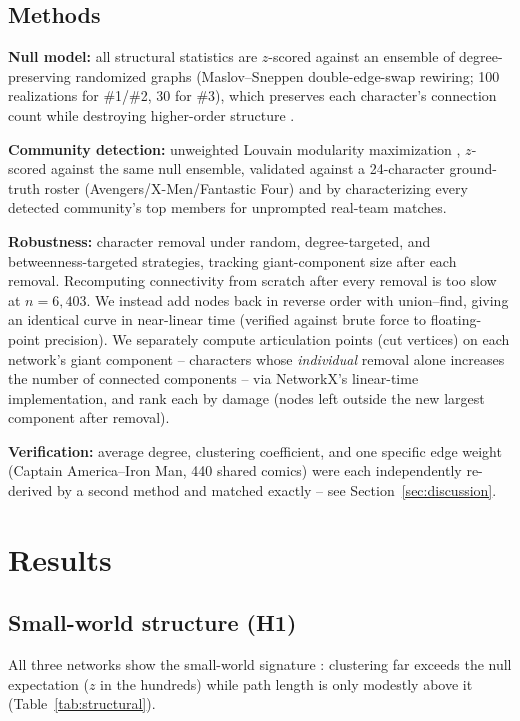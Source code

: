 \documentclass[11pt]{article}
\begin{document}
\subsection{Methods}

\textbf{Null model:} all structural statistics are $z$-scored against an ensemble of degree-preserving randomized graphs (Maslov--Sneppen double-edge-swap rewiring; 100 realizations for \#1/\#2, 30 for \#3), which preserves each character's connection count while destroying higher-order structure \citep{newman2001random}.

\textbf{Community detection:} unweighted Louvain modularity maximization \citep{blondel2008louvain}, $z$-scored against the same null ensemble, validated against a 24-character ground-truth roster (Avengers/X-Men/Fantastic Four) and by characterizing every detected community's top members for unprompted real-team matches.

\textbf{Robustness:} character removal under random, degree-targeted, and betweenness-targeted strategies, tracking giant-component size after each removal. Recomputing connectivity from scratch after every removal is too slow at $n{=}6{,}403$. We instead add nodes back in reverse order with union--find, giving an identical curve in near-linear time (verified against brute force to floating-point precision). We separately compute articulation points (cut vertices) on each network's giant component -- characters whose \emph{individual} removal alone increases the number of connected components -- via NetworkX's linear-time implementation, and rank each by damage (nodes left outside the new largest component after removal).

\textbf{Verification:} average degree, clustering coefficient, and one specific edge weight (Captain America--Iron Man, 440 shared comics) were each independently re-derived by a second method and matched exactly -- see Section~\ref{sec:discussion}.

\section{Results}
\label{sec:results}

\subsection{Small-world structure (H1)}

All three networks show the small-world signature \citep{watts1998smallworld}: clustering far exceeds the null expectation ($z$ in the hundreds) while path length is only modestly above it (Table~\ref{tab:structural}).
\end{document}
